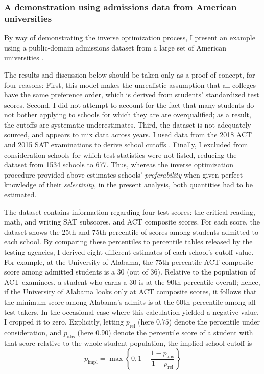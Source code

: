 \documentclass[12pt]{article}
\theoremstyle{definition}
\begin{document}
\subsubsection{A demonstration using admissions data from American universities}
By way of demonstrating the inverse optimization process, I present an example using a public-domain admissions dataset from a large set of American universities \parencite[][]{collegeadmissionskaggle}.

The results and discussion below should be taken only as a proof of concept, for four reasons: First, this model makes the unrealistic assumption that all colleges have the same preference order, which is derived from students' standardized test scores. Second, I did not attempt to account for the fact that many students do not bother applying to schools for which they are are overqualified; as a result, the cutoffs are systematic underestimates. Third, the dataset is not adequately sourced, and appears to mix data across years. I used data from the 2018 ACT and 2015 SAT examinations to derive school cutoffs \parencite[][]{ACTprofilerpt, SATpercentileranks}. Finally, I excluded from consideration schools for which test statistics were not listed, reducing the dataset from 1534 schools to 677. Thus, whereas the inverse optimization procedure provided above estimates schools' \emph{preferability} when given perfect knowledge of their \emph{selectivity}, in the present analysis, both quantities had to be estimated.

The dataset contains information regarding four test scores: the critical reading, math, and writing SAT subscores, and ACT composite scores. For each score, the dataset shows the 25th and 75th percentile of scores among students admitted to each school. By comparing these percentiles to percentile tables released by the testing agencies, I derived eight different estimates of each school's cutoff value. For example, at the University of Alabama, the 75th-percentile ACT composite score among admitted students is a 30 (out of 36). Relative to the population of ACT examinees, a student who earns a 30 is at the 90th percentile overall; hence, if the University of Alabama looks only at ACT composite scores, it follows that the minimum score among Alabama's admits is at the 60th percentile among all test-takers. In the occasional case where this calculation yielded a negative value, I cropped it to zero. Explicitly, letting $p_{\text{rel}}$ (here $0.75$) denote the percentile under consideration, and $p_{\text{abs}}$ (here $0.90$) denote the percentile score of a student with that score relative to the whole student population, the implied school cutoff is \[p_{\text{impl}} = \max\left\{0, 1 - \frac{1 - p_{\text{abs}}}{1- p_{\text{rel}}}\right\}\]
\end{document}
